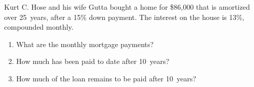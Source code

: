 \documentclass[11pt,letterpaper]{article}
\begin{document}
\newpage





 Kurt C. Hose and his wife Gutta bought a home for \$86,000 that is amortized over 25~years, after a 15\% down payment. The interest on the house is 13\%, compounded monthly. 
\begin{enumerate}
\item What are the monthly mortgage payments?
\item How much has been paid to date after 10~years?
\item How much of the loan remains to be paid after 10~years?
\end{enumerate}
\end{document}
